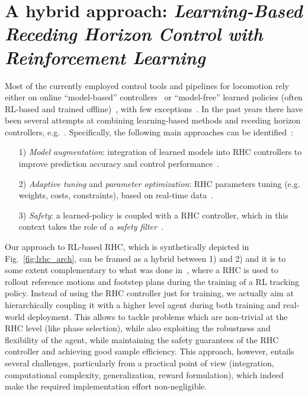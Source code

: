 \section{A hybrid approach: \textnormal{\textit{Learning-Based Receding Horizon Control with Reinforcement Learning}}}
Most of the currently employed control tools and pipelines for locomotion rely either on online ``model-based'' controllers~\cite{modern_mpc:grandia2023perceptive,web::atlas_grip_boston_dyn} or ``model-free'' learned policies (often RL-based and trained offline)~\cite{mpc_learn:aswani2012provably, mpc_learn:terzi2018learning, mpc_learn:soloperto2018learning, rl:schneider2023learning, rl:miki2024learning,mpc_learn:berkenkamp2016safe,mpc_learn:marco2016automatic,mpc_learn:brunner2015stabilizing,mpc_learn:rosolia2019learning,mpc_learn:englert2017inverse,mpc_learn:koller2018learning,mpc_learn:wabersich2021probabilistic,mpc_learn:gillulay2011guaranteed,mpc_learn:wabersich2018safe,mpc_learn:berkenkamp2017safe}, with few exceptions~\cite{hybrid_rl_to:Jenelten_2024}.
In the past years there have been several attempts at combining learning-based methods and receding horizon controllers, e.g.~\cite{mpc_learn:tsounis2020deepgait,mpc_learn:gangapurwala2021real}. Specifically, the following main approaches can be identified~\cite{mpc_learn:hewing2020learning}:
\begin{itemize}
	\item[1)] \textit{Model augmentation}: integration of learned models into RHC controllers to improve prediction accuracy and control performance~\cite{mpc_learn:aswani2012provably,mpc_learn:terzi2018learning,mpc_learn:soloperto2018learning}.
	\item[2)] \textit{Adaptive tuning} and \textit{parameter optimization}: RHC parameters tuning (e.g. weights, costs, constraints), based on real-time data~\cite{mpc_learn:berkenkamp2016safe,mpc_learn:marco2016automatic,mpc_learn:brunner2015stabilizing,mpc_learn:englert2017inverse,mpc_learn:rosolia2019learning,mpc_learn:romero2023actor}.
	\item[3)] \textit{Safety}: a learned-policy is coupled with a RHC controller, which in this context takes the role of a \textit{safety filter}~\cite{mpc_learn:koller2018learning,mpc_learn:wabersich2021probabilistic,mpc_learn:gillulay2011guaranteed,mpc_learn:wabersich2018safe,mpc_learn:berkenkamp2017safe}.
\end{itemize}
Our approach to RL-based RHC, which is synthetically depicted in Fig.~\ref{fig:lrhc_arch}, can be framed as a hybrid between 1) and 2) and it is to some extent complementary to what was done in~\cite{mpc_learn:hewing2020learning}, where a RHC is used to rollout reference motions and footstep plans during the training of a RL tracking policy. Instead of using the RHC controller just for training, we actually aim at hierarchically coupling it with a higher level agent during both training and real-world deployment. This allows to tackle problems which are non-trivial at the RHC level (like phase selection), while also exploiting the robustness and flexibility of the agent, while maintaining the safety guarantees of the RHC controller and achieving good sample efficiency. 
This approach, however, entails several challenges, particularly from a practical point of view (integration, computational complexity, generalization, reward formulation), which indeed make the required implementation effort non-negligible. 